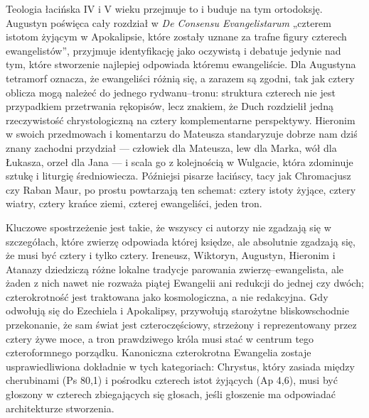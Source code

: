 Teologia łacińska IV i V wieku przejmuje to i buduje na tym ortodoksję.
Augustyn poświęca cały rozdział w \textit{De Consensu Evangelistarum} „czterem istotom żyjącym w Apokalipsie, które zostały uznane za trafne figury czterech ewangelistów”, przyjmuje identyfikację jako oczywistą i debatuje jedynie nad tym, które stworzenie najlepiej odpowiada któremu ewangeliście.
Dla Augustyna tetramorf oznacza, że ewangeliści różnią się, a zarazem są zgodni, tak jak cztery oblicza mogą należeć do jednego rydwanu–tronu: struktura czterech nie jest przypadkiem przetrwania rękopisów, lecz znakiem, że Duch rozdzielił jedną rzeczywistość chrystologiczną na cztery komplementarne perspektywy.
Hieronim w swoich przedmowach i komentarzu do Mateusza standaryzuje dobrze nam dziś znany zachodni przydział — człowiek dla Mateusza, lew dla Marka, wół dla Łukasza, orzeł dla Jana — i scala go z kolejnością w Wulgacie, która zdominuje sztukę i liturgię średniowiecza.
Późniejsi pisarze łacińscy, tacy jak Chromacjusz czy Raban Maur, po prostu powtarzają ten schemat: cztery istoty żyjące, cztery wiatry, cztery krańce ziemi, czterej ewangeliści, jeden tron.

Kluczowe spostrzeżenie jest takie, że wszyscy ci autorzy nie zgadzają się w szczegółach, które zwierzę odpowiada której księdze, ale absolutnie zgadzają się, że musi być cztery i tylko cztery.
Ireneusz, Wiktoryn, Augustyn, Hieronim i Atanazy dziedziczą różne lokalne tradycje parowania zwierzę–ewangelista, ale żaden z nich nawet nie rozważa piątej Ewangelii ani redukcji do jednej czy dwóch; czterokrotność jest traktowana jako kosmologiczna, a nie redakcyjna.
Gdy odwołują się do Ezechiela i Apokalipsy, przywołują starożytne bliskowschodnie przekonanie, że sam świat jest czteroczęściowy, strzeżony i reprezentowany przez cztery żywe moce, a tron prawdziwego króla musi stać w centrum tego czteroformnego porządku.
Kanoniczna czterokrotna Ewangelia zostaje usprawiedliwiona dokładnie w tych kategoriach: Chrystus, który zasiada między cherubinami (Ps 80,1) i pośrodku czterech istot żyjących (Ap 4,6), musi być głoszony w czterech zbiegających się głosach, jeśli głoszenie ma odpowiadać architekturze stworzenia.

